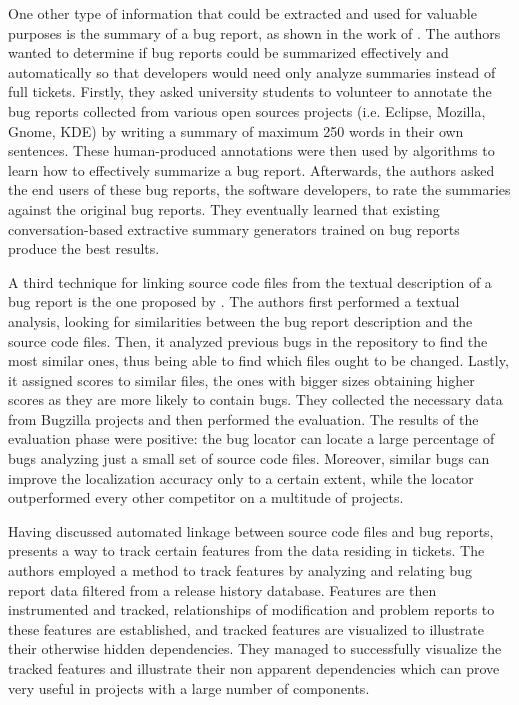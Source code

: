 \documentclass{mprop}
\begin{document}
One other type of information that could be extracted and used for valuable
purposes is the summary of a bug report, as shown in the work of 
\citet{rastkar2010summarizing}. The authors wanted to determine if bug reports
could be summarized effectively and automatically so that developers would
need only analyze summaries instead of full tickets. Firstly, they asked
university students to volunteer to annotate the bug reports collected from
various open sources projects (i.e. Eclipse, Mozilla, Gnome, KDE) by writing
a summary of maximum 250 words in their own sentences. These human-produced 
annotations were then used by algorithms to learn how to effectively summarize a 
bug report.  Afterwards, the authors asked the end users of these bug reports, the 
software developers, to rate the summaries against the original bug reports.
They eventually learned that existing conversation-based extractive summary
generators trained on bug reports produce the best results.

A third technique for linking source code files from the textual description of a 
bug report is the one proposed by \citet{zhou2012should}. The authors
first performed a textual analysis, looking for similarities between the bug 
report description and the source code files. Then, it analyzed previous bugs in 
the repository to find the most similar ones, thus being able to find which files 
ought to be changed. Lastly, it assigned scores to similar files, the ones with 
bigger sizes obtaining higher scores as they are more likely to contain bugs. They 
collected the necessary data from Bugzilla projects and then performed the 
evaluation. The results of the evaluation phase were positive: the bug locator
can locate a large percentage of bugs analyzing just a small set of source code
files. Moreover, similar bugs can improve the localization accuracy only to a 
certain extent, while the locator outperformed every other competitor on a 
multitude of projects. 

Having discussed automated linkage between source code files and bug reports, 
\citet{fischer2003analyzing} presents a way to track certain features from the
data residing in tickets. The authors employed a method to track features by 
analyzing and relating bug report data filtered from a release history database.
Features are then instrumented and tracked, relationships of modification and 
problem reports to these features are established, and tracked features are
visualized to illustrate their otherwise hidden dependencies. They managed to 
successfully visualize the tracked features and illustrate their non apparent
dependencies which can prove very useful in projects with a large number of
components.
\end{document}
